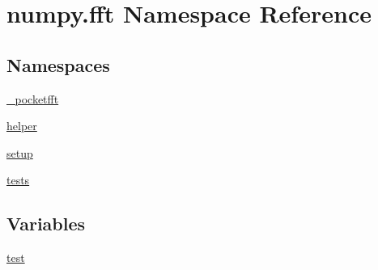 \hypertarget{namespacenumpy_1_1fft}{}\section{numpy.\+fft Namespace Reference}
\label{namespacenumpy_1_1fft}
\subsection*{Namespaces}
\begin{DoxyCompactItemize}
\item 
 \hyperlink{namespacenumpy_1_1fft_1_1__pocketfft}{\+\_\+pocketfft}
\item 
 \hyperlink{namespacenumpy_1_1fft_1_1helper}{helper}
\item 
 \hyperlink{namespacenumpy_1_1fft_1_1setup}{setup}
\item 
 \hyperlink{namespacenumpy_1_1fft_1_1tests}{tests}
\end{DoxyCompactItemize}
\subsection*{Variables}
\begin{DoxyCompactItemize}
\item 
\hyperlink{namespacenumpy_1_1fft_ad7324baa30d876111354e55fa02a3a56}{test}
\end{DoxyCompactItemize}


